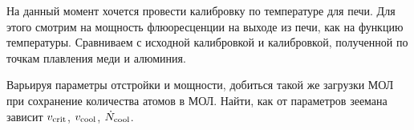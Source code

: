

\startp
{}
На данный момент хочется провести калибровку по температуре для печи. Для этого смотрим на мощность флюоресценции на выходе из печи, как на функцию температуры. Сравниваем с исходной калибровкой и калибровкой, полученной по точкам плавления меди и алюминия. 

Варьируя параметры отстройки и мощности, добиться такой же загрузки МОЛ при сохранение количества атомов в МОЛ. Найти, как от параметров зеемана зависит $v_{\textnormal{crit}}$, $v_{\textnormal{cool}}$, $\dot{N}_{\textnormal{cool}}$.
